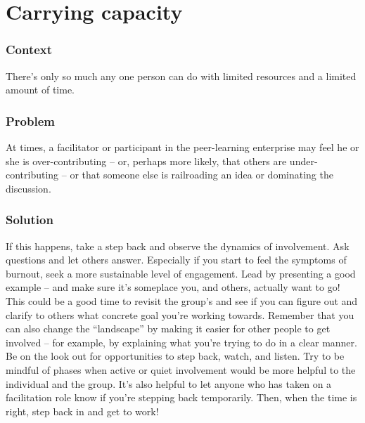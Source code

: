 \begingroup \color{BurntOrange}

\section{Carrying capacity}\label{sec:Carrying_capacity}
\subsubsection*{Context} There's only so much any one person can do with limited resources and a limited amount of time.

\subsubsection*{Problem} At times, a facilitator or participant in the
peer-learning enterprise may feel he or she is over-contributing -- or,
perhaps more likely, that others are under-contributing -- or that
someone else is railroading an idea or dominating the discussion.

\subsubsection*{Solution} If this happens, take a step back and observe the
dynamics of involvement. Ask questions and let others
answer. Especially if you start to feel the symptoms of burnout, seek
a more sustainable level of engagement.  Lead by presenting a good
example -- and make sure it's someplace you, and others, actually want
to go!  This could be a good time to revisit the group's
 and see if you can figure out and clarify to
others what concrete goal you're working towards. Remember that you
can also change the ``landscape'' by making it easier for other people
to get involved -- for example, by explaining what you're trying to do
in a clear manner.  Be on the look out for opportunities to step back,
watch, and listen.  Try to be mindful of phases when active or quiet
involvement would be more helpful to the individual and the group.
It's also helpful to let anyone who has taken on a facilitation role
know if you're stepping back temporarily.  Then, when the time is
right, step back in and get to work!

